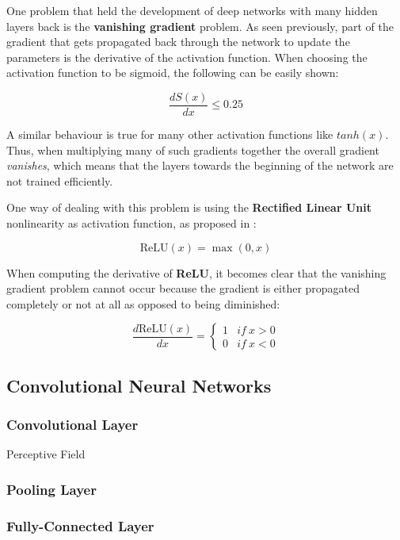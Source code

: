 One problem that held the development of deep networks with many hidden layers back is the \textbf{vanishing gradient} problem.
As seen previously, part of the gradient that gets propagated back through the network to update the parameters is the derivative of the activation function.
When choosing the activation function to be sigmoid, the following can be easily shown:

\begin{equation}
    \frac{dS(x)}{dx} \leq 0.25
\end{equation}

A similar behaviour is true for many other activation functions like $tanh(x)$.
Thus, when multiplying many of such gradients together the overall gradient \textit{vanishes}, which means that the layers towards the beginning of the network are not trained efficiently.

One way of dealing with this problem is using the \textbf{Rectified Linear Unit} nonlinearity as activation function, as proposed in \cite{nair_rectified_2010}:

\begin{equation}
    \text{ReLU}(x) = \max (0, x)
\end{equation}

When computing the derivative of \textbf{ReLU}, it becomes clear that the vanishing gradient problem cannot occur because the gradient is either propagated completely or not at all as opposed to being diminished:

\begin{equation}
    \frac{d \text{ReLU}(x)}{dx} = \begin{cases}
        1 & if ~ x > 0 \\
        0 & if ~ x < 0
    \end{cases}
\end{equation}

\subsection{Convolutional Neural Networks}
\subsubsection{Convolutional Layer}
Perceptive Field


\subsubsection{Pooling Layer}

\subsubsection{Fully-Connected Layer}